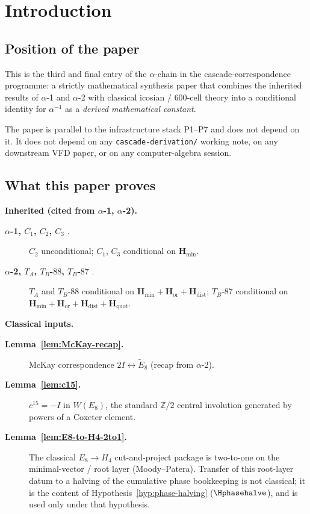 \documentclass[11pt, a4paper]{amsart}
\theoremstyle{definition}
\newcommand{\Z}{\mathbb{Z}}
\newcommand{\Hmin}{\mathbf{H}_{\min}}
\newcommand{\Hor}{\mathbf{H}_{\mathrm{or}}}
\newcommand{\Hdist}{\mathbf{H}_{\mathrm{dist}}}
\newcommand{\Hquot}{\mathbf{H}_{\mathrm{quot}}}
\begin{document}
\tableofcontents

\section{Introduction}
\label{sec:intro}

\subsection{Position of the paper}

This is the third and final entry of the $\alpha$-chain in
the cascade-correspondence programme: a strictly mathematical
synthesis paper that combines the inherited results of
$\alpha$-1 \cite{Cascade12D} and $\alpha$-2
\cite{CascadePhasonCoxeter} with classical icosian /
$600$-cell theory into a conditional identity for $\alpha^{-1}$
as a \emph{derived mathematical constant}.

The paper is parallel to the infrastructure stack P1--P7 and
does not depend on it. It does not depend on any
\texttt{cascade-derivation/} working note, on any downstream
VFD paper, or on any computer-algebra session.

\subsection{What this paper proves}

\textbf{Inherited (cited from $\alpha$-1, $\alpha$-2).}
\begin{description}
\item[\textbf{$\alpha$-1, $C_1$, $C_2$, $C_3$}
  \cite{Cascade12D}.] $C_2$ unconditional; $C_1$, $C_3$
  conditional on $\Hmin$.
\item[\textbf{$\alpha$-2, $T_A$, $T_B$-$88$, $T_B$-$87$}
  \cite{CascadePhasonCoxeter}.] $T_A$ and $T_B$-$88$
  conditional on $\Hmin + \Hor + \Hdist$; $T_B$-$87$
  conditional on $\Hmin + \Hor + \Hdist + \Hquot$.
\end{description}

\textbf{Classical inputs.}
\begin{description}
\item[\textbf{Lemma~\ref{lem:McKay-recap}.}] McKay
  correspondence $2I \leftrightarrow \widetilde{E}_8$
  (recap from $\alpha$-2).
\item[\textbf{Lemma~\ref{lem:c15}.}] $c^{15} = -I$ in
  $W(E_8)$, the standard $\Z/2$ central involution generated
  by powers of a Coxeter element.
\item[\textbf{Lemma~\ref{lem:E8-to-H4-2to1}.}] The classical
  $E_8 \to H_4$ cut-and-project package is two-to-one on the
  minimal-vector / root layer (Moody--Patera). Transfer of
  this root-layer datum to a halving of the cumulative phase
  bookkeeping is not classical; it is the content of
  Hypothesis~\ref{hyp:phase-halving} ($\Hphasehalve$), and is
  used only under that hypothesis.
\end{description}
\end{document}
